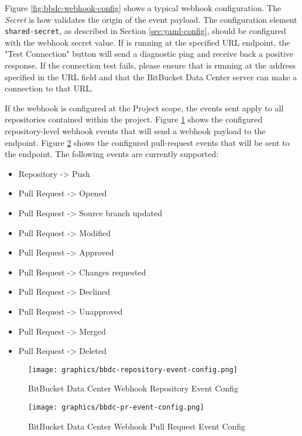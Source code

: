 Figure \ref{fig:bbdc-webhook-config} shows a typical webhook configuration.  The \textit{Secret} is how \cxoneflow
validates the origin of the event payload.  The configuration element \texttt{shared-secret}, as described
in Section \ref{sec:yaml-config}, should be configured with the webhook secret value.  If \cxoneflow
is running at the specified URL endpoint, the "Test Connection" button will send a diagnostic ping
and receive back a positive response.  If the connection test fails, please ensure that \cxoneflow is running
at the address specified in the URL field and that the BitBucket Data Center server can make a connection
to that URL.

If the webhook is configured at the Project scope, the events sent apply to all repositories contained
within the project.  Figure \ref{fig:bbdc-repo-event-config} shows the configured repository-level webhook 
events that will send a webhook payload to the \cxoneflow endpoint. 
Figure \ref{fig:bbdc-pr-event-config} shows the configured pull-request events that will be sent to 
the \cxoneflow endpoint.  The following events are currently supported:

\begin{itemize}
    \item Repository -> Push
    \item Pull Request -> Opened
    \item Pull Request -> Source branch updated
    \item Pull Request -> Modified
    \item Pull Request -> Approved
    \item Pull Request -> Changes requested
    \item Pull Request -> Declined
    \item Pull Request -> Unapproved
    \item Pull Request -> Merged
    \item Pull Request -> Deleted
\end{itemize}


\begin{figure}[ht]
    \texttt{[image: graphics/bbdc-repository-event-config.png]}
    \caption{BitBucket Data Center Webhook Repository Event Config}
    \label{fig:bbdc-repo-event-config}
\end{figure}

\begin{figure}[ht]
    \texttt{[image: graphics/bbdc-pr-event-config.png]}
    \caption{BitBucket Data Center Webhook Pull Request Event Config}
    \label{fig:bbdc-pr-event-config}
\end{figure}


